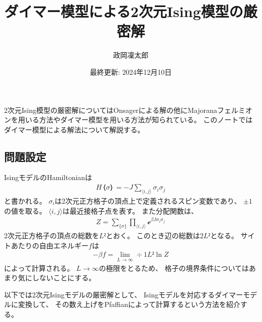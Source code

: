 \documentclass[12pt]{ltjsarticle}
\begin{document}
\title{ダイマー模型による2次元Ising模型の厳密解}
\author{政岡凜太郎}
\date{最終更新: 2024年12月10日}
\maketitle

2次元Ising模型の厳密解についてはOnsagerによる解の他にMajoranaフェルミオンを用いる方法やダイマー模型を用いる方法が知られている。
このノートではダイマー模型による解法について解説する。

\subsection*{
    問題設定
}
IsingモデルのHamiltonianは
\begin{align}
    H｛σ｝ = -J∑_{⟨i,j⟩}σ_iσ_j
\end{align}
と書かれる。
$σ_i$は2次元正方格子の頂点上で定義されるスピン変数であり、
$±1$の値を取る。
$⟨i,j⟩$は最近接格子点を表す。
また分配関数は、
\begin{align}
    Z = ∑_{\{σ\}}∏_{⟨i,j⟩}ℯ^{βJσ_iσ_j}
\end{align}
2次元正方格子の頂点の総数を$L²$とおく。
このとき辺の総数は$2L²$となる。
サイトあたりの自由エネルギー$f$は
\begin{align}
    -βf = \lim_{L → ∞}÷1{L²}\ln Z
\end{align}
によって計算される。
$L → ∞$の極限をとるため、
格子の境界条件についてはあまり気にしないことにする。

以下では2次元Isingモデルの厳密解として、
Isingモデルを対応するダイマーモデルに変換して、
その数え上げをPfaffianによって計算するという方法を紹介する。
\end{document}
